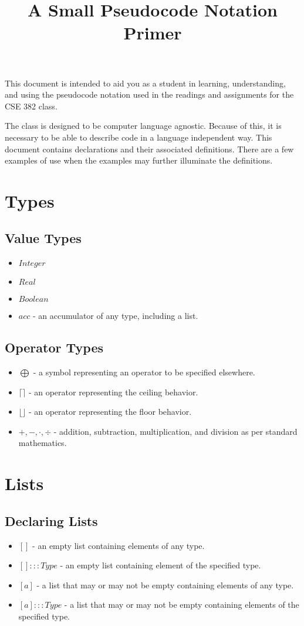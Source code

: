 \documentclass[12pt]{amsart}
\title{A Small Pseudocode Notation Primer}
\begin{document}
\maketitle

This document is intended to aid you as a student in learning, understanding, and using the pseudocode notation used in the readings and assignments for the  CSE 382 class.

The class is designed to be computer language agnostic. Because of this, it is necessary to be able to describe code in a language independent way. This document contains declarations and their associated definitions. There are a few examples of use when the examples may further illuminate the definitions.

\section{Types}
\subsection{Value Types}
\begin{itemize}
\item $Integer$
\item $Real$
\item $Boolean$
\item $acc$ - an accumulator of any type, including a list.
\end{itemize}
\subsection{Operator Types}
\begin{itemize}
\item $\bigoplus$ - a symbol representing an operator to be specified elsewhere.
\item $\lceil \rceil$ - an operator representing the ceiling behavior.
\item $\lfloor \rfloor$ - an operator representing the floor behavior.
\item $+,-,\cdot,\div$ - addition, subtraction, multiplication, and division as per standard mathematics.
\end{itemize}
\section{Lists}
\subsection{Declaring Lists}
\begin{itemize}
\item $[]$ - an empty list containing elements of any type.
\item $[]:::Type$ - an empty list containing element of the specified type.
\item $[a]$ - a list that may or may not be empty containing elements of any type.
\item $[a]:::Type$ - a list that may or may not be empty containing elements of the specified type.
\end{itemize}
\end{document}
